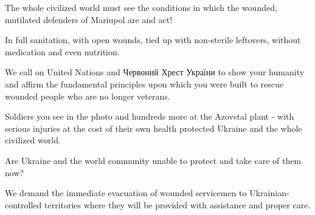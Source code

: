  
 
 
 
 

The whole civilized world must see the conditions in which the wounded,
mutilated defenders of Mariupol are and act!

In full sanitation, with open wounds, tied up with non-sterile leftovers,
without medication and even nutrition.

We call on United Nations and Червоний Хрест України to show your humanity and
affirm the fundamental principles upon which you were built to rescue wounded
people who are no longer veterans.

Soldiers you see in the photo and hundreds more at the Azovstal plant - with
serious injuries at the cost of their own health protected Ukraine and the
whole civilized world.

Are Ukraine and the world community unable to protect and take care of them
now?

We demand the immediate evacuation of wounded servicemen to
Ukrainian-controlled territories where they will be provided with assistance
and proper care.
 
